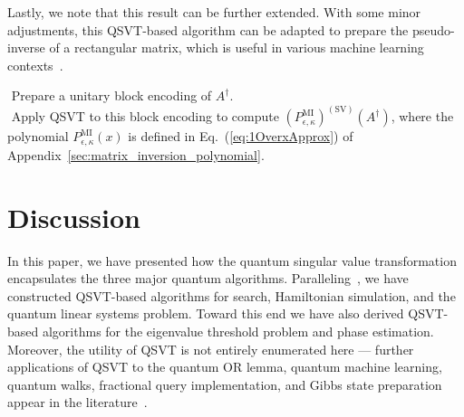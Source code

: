 \documentclass[aps,pra,showpacs,notitlepage,twocolumn,superscriptaddress,nofootinbib]{revtex4-1}
\begin{document}
    Lastly, we note that this result can be further extended. With some minor adjustments, this QSVT-based algorithm can be adapted to prepare the pseudo-inverse of a rectangular matrix, which is useful in various machine learning contexts~\cite{Gily_n_2019}.
    
    \begin{algorithm}[htpb] 
     \Proc{}
     
    $ $ Prepare a unitary block encoding of $A^\dag$.\\
    $ $ Apply QSVT to this block encoding to compute $(P^{\text{MI}}_{\epsilon,\kappa})^{(\text{SV})}(A^\dag)$, where the polynomial $P^{\text{MI}}_{\epsilon,\kappa}(x)$ is defined in Eq.~(\ref{eq:1OverxApprox}) of Appendix~\ref{sec:matrix_inversion_polynomial}.\\
    \caption{Matrix Inversion by QSVT}
    \label{alg:MatrixInversionByQSVT}
    \end{algorithm}







\section{Discussion}\label{sec:Discussion}

    In this paper, we have presented how the quantum singular value transformation encapsulates the three major quantum algorithms. Paralleling~\cite{Gily_n_2019}, we have constructed QSVT-based algorithms for search, Hamiltonian simulation, and the quantum linear systems problem. Toward this end we have also derived QSVT-based algorithms for the eigenvalue threshold problem and phase estimation. Moreover, the utility of QSVT is not entirely enumerated here — further applications of QSVT to the quantum OR lemma, quantum machine learning, quantum walks, fractional query implementation, and Gibbs state preparation appear in the literature~\cite{Gily_n_2019}. 
    
\end{document}
